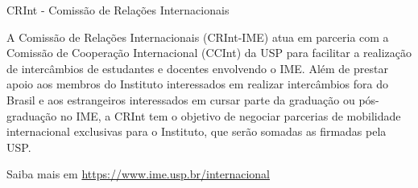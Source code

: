 \begin{secao}{CRInt - Comissão de Relações Internacionais}

A Comissão de Relações Internacionais (CRInt-IME) atua em parceria com a Comissão
de Cooperação Internacional (CCInt) da USP para facilitar a realização de
intercâmbios de estudantes e docentes envolvendo o IME. Além de prestar apoio aos
membros do Instituto interessados em realizar intercâmbios fora do Brasil e aos
estrangeiros interessados em cursar parte da graduação ou pós-graduação no IME,
a CRInt tem o objetivo de negociar parcerias de mobilidade internacional exclusivas
para o Instituto, que serão somadas as firmadas pela USP.

Saiba mais em \url{https://www.ime.usp.br/internacional}

\end{secao}
